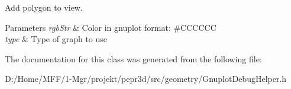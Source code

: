 Add polygon to view. 


\begin{DoxyParams}{Parameters}
{\em rgb\+Str} & Color in gnuplot format\+: \#\+C\+C\+C\+C\+CC \\
\hline
{\em type} & Type of graph to use \\
\hline
\end{DoxyParams}


The documentation for this class was generated from the following file\+:\begin{DoxyCompactItemize}
\item 
D\+:/\+Home/\+M\+F\+F/1-\/\+Mgr/projekt/pepr3d/src/geometry/Gnuplot\+Debug\+Helper.\+h\end{DoxyCompactItemize}
